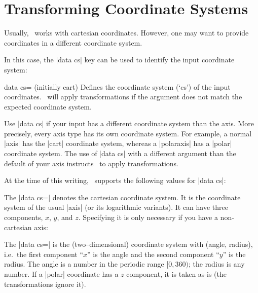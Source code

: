 \section{Transforming Coordinate Systems}
\label{key:data:cs}
Usually, \PGFPlots\ works with cartesian coordinates. However, one may want to provide coordinates in a different coordinate system.

In this case, the |data cs| key can be used to identify the input coordinate system:

\begin{pgfplotskey}{data cs= (initially cart)}
	Defines the coordinate system (`cs') of the input coordinates. \PGFPlots\ will apply transformations if the argument does not match the expected coordinate system.

	Use |data cs| if your input has a different coordinate system than the axis. More precisely,
	every axis type has its own coordinate system. For example, a normal |axis| has the |cart| coordinate system, whereas a |polaraxis| has a |polar| coordinate system. The use of |data cs| with a different argument than the default of your axis instructs \PGFPlots\ to apply transformations.
	
	At the time of this writing, \PGFPlots\ supports the following values for |data cs|:

	The |data cs=| denotes the cartesian coordinate system. It is the coordinate system of the usual |axis| (or its logarithmic variants). It can have three components, $x$, $y$, and $z$. Specifying it is only necessary if you have a non-cartesian axis:
\begin{codeexample}[]
\end{codeexample}

	The |data cs=| is the (two--dimensional) coordinate system with (angle, radius), i.e.\ the first component ``$x$'' is the angle and the second component ``$y$'' is the radius. The angle is a number in the periodic range $[0,360)$; the radius is any number. If a |polar| coordinate has a $z$ component, it is taken as-is (the transformations ignore it).
\begin{codeexample}[]
\end{codeexample}


\end{pgfplotskey}
